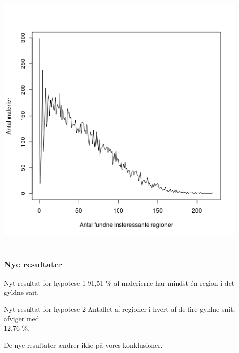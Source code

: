 \documentclass[xcolor=table]{beamer}
\begin{document}
\begin{frame}
\begin{columns}[t]
        \centering
        \begin{block}{}
            \centering
            \includegraphics[width=0.98\textwidth]{billeder/totalregions_var_ny}
        \end{block}

    \end{columns}

\end{frame}

\subsection*{}
\begin{frame}

    \frametitle{Nye resultater}

    \begin{block}{Nyt resultat for hypotese 1\hspace{12em}}
        91,51 \% af malerierne har mindst én region i det gyldne snit.\\
    \end{block}

    \begin{block}{Nyt resultat for hypotese 2\hspace{14em}}
        Antallet af regioner i hvert af de fire gyldne snit, afviger med \\12,76 \%.
    \end{block}

    De nye resultater ændrer ikke på vores konklusioner.

\end{frame}
\end{document}
